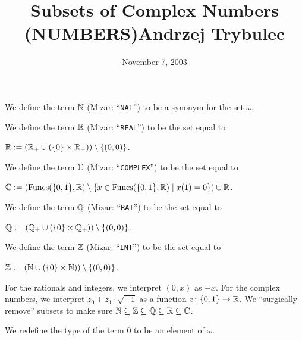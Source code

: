 \documentclass{article}
\title{Subsets of Complex Numbers (NUMBERS)}
\title{Andrzej Trybulec}
\date{November 7, 2003}
\begin{document}
\maketitle

\begin{notation}\index{$\NN$}%
We define the term $\NN$ (Mizar: ``\verb#NAT#'') to be a synonym for the
set $\omega$.
\end{notation}

\begin{definition}\index{$\RR$}%
We define the term $\RR$ (Mizar: ``\verb#REAL#'') to be the set equal to
\begin{defn}
\item $\mathbb{R} := (\mathbb{R}_{+}\cup(\{0\}\times\mathbb{R}_{+}))\setminus\{(0,0)\}$.
\end{defn}
\end{definition}

\begin{definition}\index{$\CC$}%
We define the term $\CC$ (Mizar: ``\verb#COMPLEX#'') to be the set equal to
\begin{defn}
\item $\mathbb{C}:=(\operatorname{Funcs}(\{0,1\},\mathbb{R})\setminus\{x\in\operatorname{Funcs}(\{0,1\},\mathbb{R})\mid x(1)=0\})\cup\mathbb{R}$.
\end{defn}\index{$\QQ$}%
We define the term $\QQ$ (Mizar: ``\verb#RAT#'') to be the set equal to
\begin{defn}
\item $\mathbb{Q}:=(\mathbb{Q}_{+}\cup(\{0\}\times\mathbb{Q}_{+}))\setminus\{(0,0)\}$.
\end{defn}\index{$\ZZ$}%
We define the term $\ZZ$ (Mizar: ``\verb#INT#'') to be the set equal to
\begin{defn}
\item $\mathbb{Z}:=(\mathbb{N}\cup(\{0\}\times\mathbb{N}))\setminus\{(0,0)\}$.
\end{defn}
\end{definition}
\begin{remark}
For the rationals and integers, we interpret $(0,x)$ as $-x$.
For the complex numbers, we interpret $z_{0}+z_{1}\cdot\sqrt{-1}$
as a function $z\colon\{0,1\}\to\mathbb{R}$.
We ``surgically remove'' subsets to make sure $\mathbb{N}\subseteq\mathbb{Z}\subseteq\mathbb{Q}\subseteq\mathbb{R}\subseteq\mathbb{C}$.
\end{remark}

\begin{definition}
We redefine the type of the term $0$ to be an element of $\omega$.
\end{definition}
\end{document}
